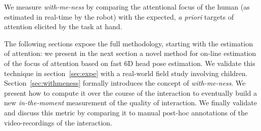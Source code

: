 \documentclass{sig-alternate}
\begin{document}
We measure \emph{with-me-ness} by comparing the attentional focus of the human
(as estimated in real-time by the robot) with the expected, {\it a priori}
targets of attention elicited by the task at hand.

The following sections expose the full methodology, starting with the estimation
of attention: we present in the next section a novel method for on-line estimation
of the focus of attention based on fast 6D head pose estimation. We validate
this technique in section~\ref{sec:expe} with a real-world field study involving
children. Section~\ref{sec:withmeness} formally introduces the concept of
\emph{with-me-ness}. We present how to compute it over the course of the
interaction to eventually build a new \emph{in-the-moment} measurement of the
quality of interaction. We finally validate and discuss this metric by comparing
it to manual post-hoc annotations of the video-recordings of the interaction.

%
%
%
\end{document}

